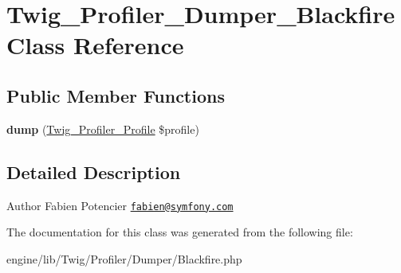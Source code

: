 \hypertarget{class_twig___profiler___dumper___blackfire}{}\section{Twig\+\_\+\+Profiler\+\_\+\+Dumper\+\_\+\+Blackfire Class Reference}
\label{class_twig___profiler___dumper___blackfire}
\subsection*{Public Member Functions}
\begin{DoxyCompactItemize}
\item 
\hypertarget{class_twig___profiler___dumper___blackfire_a6c5847be5fe44203b20ccca8ce59c05b}{}{\bfseries dump} (\hyperlink{class_twig___profiler___profile}{Twig\+\_\+\+Profiler\+\_\+\+Profile} \$profile)\label{class_twig___profiler___dumper___blackfire_a6c5847be5fe44203b20ccca8ce59c05b}

\end{DoxyCompactItemize}


\subsection{Detailed Description}
\begin{DoxyAuthor}{Author}
Fabien Potencier \href{mailto:fabien@symfony.com}{\tt fabien@symfony.\+com} 
\end{DoxyAuthor}


The documentation for this class was generated from the following file\+:\begin{DoxyCompactItemize}
\item 
engine/lib/\+Twig/\+Profiler/\+Dumper/Blackfire.\+php\end{DoxyCompactItemize}
